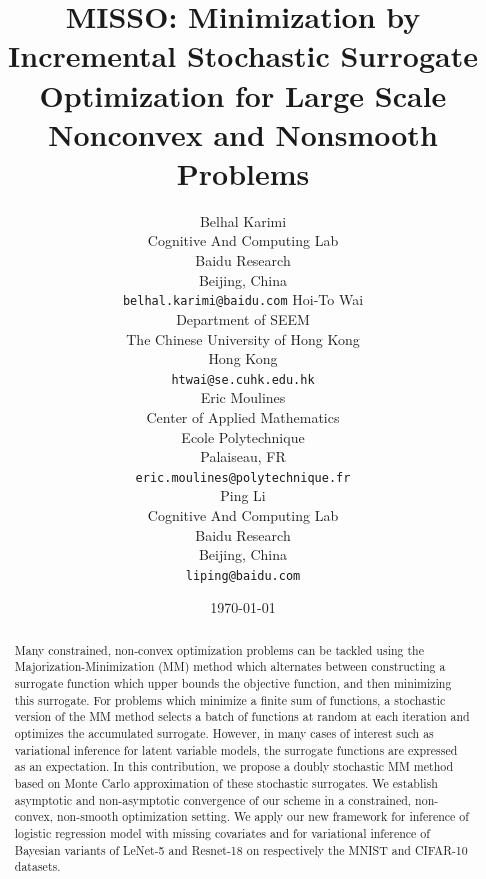 \documentclass[11pt]{article}
\theoremstyle{t}
\begin{document}
\title{MISSO: Minimization by Incremental Stochastic Surrogate Optimization for Large Scale Nonconvex and Nonsmooth Problems}

\author{
  Belhal Karimi \\
  Cognitive And Computing Lab\\
  Baidu Research\\
  Beijing, China \\
  \texttt{belhal.karimi@baidu.com} 
   \And
   Hoi-To Wai \\
   Department of SEEM\\
   The Chinese University of Hong Kong\\
   Hong Kong \\
   \texttt{htwai@se.cuhk.edu.hk} \\
   \And
   Eric Moulines \\
   Center of Applied Mathematics\\
   Ecole Polytechnique\\
   Palaiseau, FR \\
   \texttt{eric.moulines@polytechnique.fr} \\
   \And
  Ping Li \\
  Cognitive And Computing Lab\\
  Baidu Research\\
  Beijing, China \\
  \texttt{liping@baidu.com} \\
}

\date{\today}

\maketitle

\begin{abstract}
Many constrained, non-convex optimization problems can be tackled using the Majorization-Minimization (MM) method which alternates between constructing a surrogate function which upper bounds the objective function, and then minimizing this surrogate.
For problems which minimize a finite sum of functions, a stochastic version of the MM method selects a batch of functions at random at each iteration and optimizes the accumulated surrogate.
However, in many cases of interest such as  variational inference for latent variable models, the surrogate functions are expressed as an expectation. In this contribution, we propose a doubly stochastic MM method based on Monte Carlo approximation of these stochastic surrogates.
We establish asymptotic and non-asymptotic convergence of our scheme in a constrained, non-convex, non-smooth optimization setting.
We apply our new framework for inference of logistic regression model with missing covariates and for variational inference of Bayesian variants of LeNet-5 and Resnet-18 on respectively the MNIST and CIFAR-10 datasets.
\end{abstract}
\end{document}
